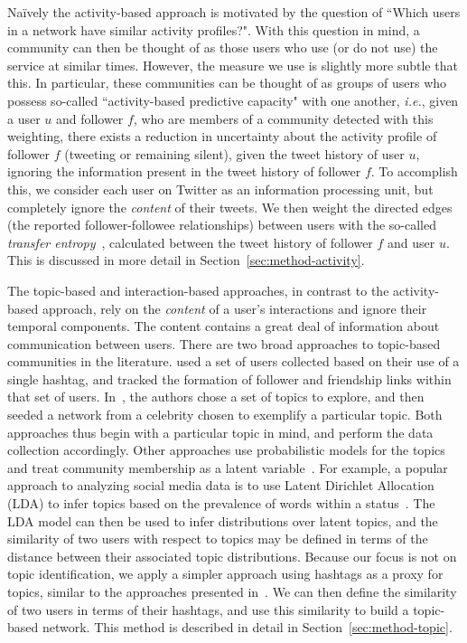 \documentclass[10pt,letterpaper]{article}
\begin{document}
Na\"ively the activity-based approach is motivated by the question of ``Which users in a network have similar activity profiles?".
 With this question in mind, a community can then be thought of as those users who use (or do not use) the service at similar times. However, the measure we use is slightly more subtle that this. In particular, these communities can be thought of as groups of users who possess so-called ``activity-based predictive capacity" with one another, \emph{i.e.}, given a user $u$ and follower $f$, who are members of a community detected with this weighting, there exists a reduction in uncertainty about the activity profile of follower $f$ (tweeting or remaining silent), given the tweet history of user $u$, ignoring the information present in the tweet history of follower $f$.  To accomplish this, we consider each user on Twitter as an information processing unit, but completely ignore the \emph{content} of their tweets. We then weight the directed edges (the reported follower-followee relationships) between users with the so-called \emph{transfer entropy}~\cite{schreiber2000measuring}, calculated between the tweet history of follower $f$ and user $u$. This is discussed in more detail in Section~\ref{sec:method-activity}.

The topic-based and interaction-based approaches, in contrast to the activity-based approach, rely on the \emph{content} of a user's interactions and ignore their temporal components. The content contains a great deal of information about communication between users.
There are two broad approaches to topic-based communities in the literature. \cite{rossi2012conversation} used a set of users collected based on their use of a single hashtag, and tracked the formation of follower and friendship links within that set of users. In~\cite{lim2012following}, the authors chose a set of topics to explore, and then seeded a network from a celebrity chosen to exemplify a particular topic. Both approaches thus begin with a particular topic in mind, and perform the data collection accordingly. Other approaches use probabilistic models for the topics and treat community membership as a latent variable~\cite{yin2012latent}.
For example, a popular approach to analyzing social media data is to use Latent Dirichlet Allocation (LDA) to infer topics based on the prevalence of words within a status~\cite{zhao2011comparing,michelson2010discovering}. The LDA model can then be used to infer distributions over latent topics, and the similarity of two users with respect to topics may be defined in terms of the distance between their associated topic distributions. Because our focus is not on topic identification, we apply a simpler approach using hashtags as a proxy for topics, similar to the approaches presented in~\cite{becker2011beyond,tsur2012s}. We can then define the similarity of two users in terms of their hashtags, and use this similarity to build a topic-based network. This method is described in detail in Section~\ref{sec:method-topic}.
\end{document}
